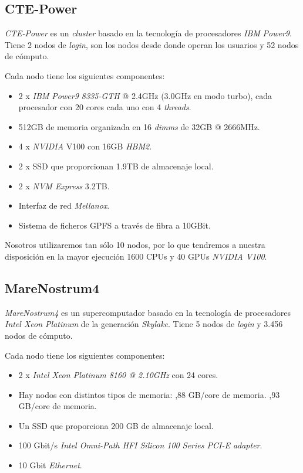 \subsection{CTE-Power}
\label{sec:power}

\textit{CTE-Power} es un \textit{cluster} basado en la tecnología de procesadores \textit{IBM} \textit{Power9}. Tiene 2 nodos de \textit{login}, son los nodos desde donde operan los usuarios y 52 nodos de cómputo. 
\par\smallskip
Cada nodo tiene los siguientes componentes:
\par\smallskip
\begin{itemize}
	\item 2 x \textit{IBM Power9 8335-GTH} @ 2.4GHz (3.0GHz en modo turbo), cada procesador con 20 cores cada uno con 4 \textit{threads}.
	\item 512GB de memoria organizada en 16 \textit{dimms} de 32GB @ 2666MHz.
	\item 4 x \textit{NVIDIA} V100 con 16GB \textit{HBM2}.
	\item 2 x SSD que proporcionan 1.9TB de almacenaje local.
	\item 2 x \textit{NVM Express} 3.2TB.
	\item Interfaz de red \textit{Mellanox}.
	\item Sistema de ficheros GPFS a través de fibra a 10GBit.
\end{itemize}

Nosotros utilizaremos tan sólo 10 nodos, por lo que tendremos a nuestra disposición en la mayor ejecución 1600 CPUs y 40 GPUs \textit{NVIDIA V100}. 

\subsection{MareNostrum4}
\label{sec:mare}

\textit{MareNostrum4} es un supercomputador basado en la tecnología de procesadores \textit{Intel Xeon Platinum} de la generación \textit{Skylake}. Tiene 5 nodos de \textit{login} y 3.456 nodos de cómputo.
\par\smallskip
Cada nodo tiene los siguientes componentes:
\par\smallskip
\begin{itemize}
	\item 2 x \textit{Intel Xeon Platinum 8160 @ 2.10GHz} con 24 cores.
	\item Hay nodos con distintos tipos de memoria:
		,88 GB/core de memoria. %
		,93 GB/core de memoria.
	\item Un SSD que proporciona 200 GB de almacenaje local.
	\item 100 Gbit/s \textit{Intel Omni-Path HFI Silicon 100 Series PCI-E adapter}.
	\item 10 Gbit \textit{Ethernet}.
\end{itemize}


